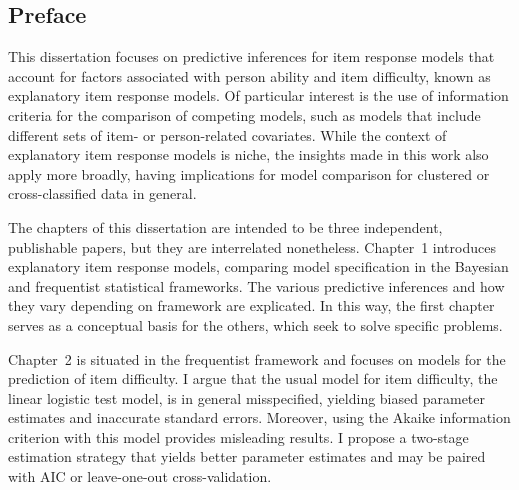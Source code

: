 \documentclass{ucbthesis}
\begin{document}
\begin{frontmatter}



\tableofcontents
\clearpage
\listoffigures
\clearpage
\listoftables

\chapter*[Preface]{Preface}

This dissertation focuses on predictive inferences for item response models that account for factors associated with person ability and item difficulty, known as explanatory item response models. Of particular interest is the use of information criteria for the comparison of competing models, such as models that include different sets of item- or person-related covariates. While the context of explanatory item response models is niche, the insights made in this work also apply more broadly, having implications for model comparison for clustered or cross-classified data in general.

The chapters of this dissertation are intended to be three independent, publishable papers, but they are interrelated nonetheless. Chapter~1 introduces explanatory item response models, comparing model specification in the Bayesian and frequentist statistical frameworks. The various predictive inferences and how they vary depending on framework are explicated. In this way, the first chapter serves as a conceptual basis for the others, which seek to solve specific problems.

Chapter~2 is situated in the frequentist framework and focuses on models for the prediction of item difficulty. I argue that the usual model for item difficulty, the linear logistic test model, is in general misspecified, yielding biased parameter estimates and inaccurate standard errors. Moreover, using the Akaike information criterion with this model provides misleading results. I propose a two-stage estimation strategy that yields better parameter estimates and may be paired with AIC or leave-one-out cross-validation.


\end{frontmatter}
\end{document}
